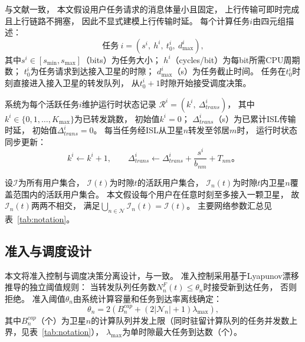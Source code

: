 \documentclass[a4paper,11pt]{article}
\begin{document}
与文献\cite{zhang2024mhspo}一致，
本文假设用户任务请求的消息体量小且固定，
上行传输可即时完成且上行链路不拥塞，
因此不显式建模上行传输时延。
每个计算任务$i$由四元组描述：
\begin{equation}
    \text{任务}~i = (s^i,~h^i,~t^i_0,~d^i_{\max}),
    \label{eq:task_tuple}
\end{equation}
其中$s^i \in [s_{\min}, s_{\max}]$（bits）为任务大小；
$h^i$（cycles/bit）为每bit所需CPU周期数；
$t^i_0$为任务请求到达接入卫星的时隙；
$d^i_{\max}$（s）为任务截止时间。
任务在$t^i_0$时刻直接进入接入卫星的转发队列，
从$t^i_0 + 1$时隙开始接受调度决策。

系统为每个活跃任务$i$维护运行时状态记录
$\mathcal{R}^i = (k^i,~\Delta^i_{trans})$，
其中$k^i \in \{0,1,\ldots,K_{\max}\}$为已转发跳数，
初始值$k^i=0$；
$\Delta^i_{trans}$（s）为已累计ISL传输时延，
初始值$\Delta^i_{trans}=0$。
每当任务经ISL从卫星$n$转发至邻居$m$时，
运行时状态同步更新：
\begin{equation}
    k^i \leftarrow k^i + 1,\qquad
    \Delta^i_{trans} \leftarrow \Delta^i_{trans}
    + \frac{s^i}{b_{nm}} + T_{nm}。
    \label{eq:runtime_update}
\end{equation}

设$\mathcal{I}$为所有用户集合，
$\mathcal{I}(t)$为时隙$t$的活跃用户集合，
$\mathcal{I}_n(t)$为时隙$t$内卫星$n$覆盖范围内的活跃用户集合。
本文假设每个用户在任意时刻至多接入一颗卫星，
故$\mathcal{I}_n(t)$两两不相交，
满足$\bigcup_{n \in \mathcal{N}} \mathcal{I}_n(t) = \mathcal{I}(t)$。
主要网络参数汇总见表~\ref{tab:notation}。

\subsection{准入与调度设计}

本文将准入控制与调度决策分离设计，与\cite{zhang2024mhspo}一致。
准入控制采用基于Lyapunov漂移推导的独立阈值规则：
当转发队列任务数$N^F_n(t) \leq \theta_n$时接受新到达任务，
否则拒绝。
准入阈值$\theta_n$由系统计算容量和任务到达率离线确定：
\begin{equation}
    \theta_n = 2\left(B^{cap}_n
    + (2|\mathcal{N}_n|+1)\lambda_{\max}\right),
    \label{eq:theta}
\end{equation}
其中$B^{cap}_n$（个）为卫星$n$的计算队列并发上限（同时驻留计算队列的任务并发数上界，见表~\ref{tab:notation}），
$\lambda_{\max}$为单时隙最大任务到达数（个）。
\end{document}
